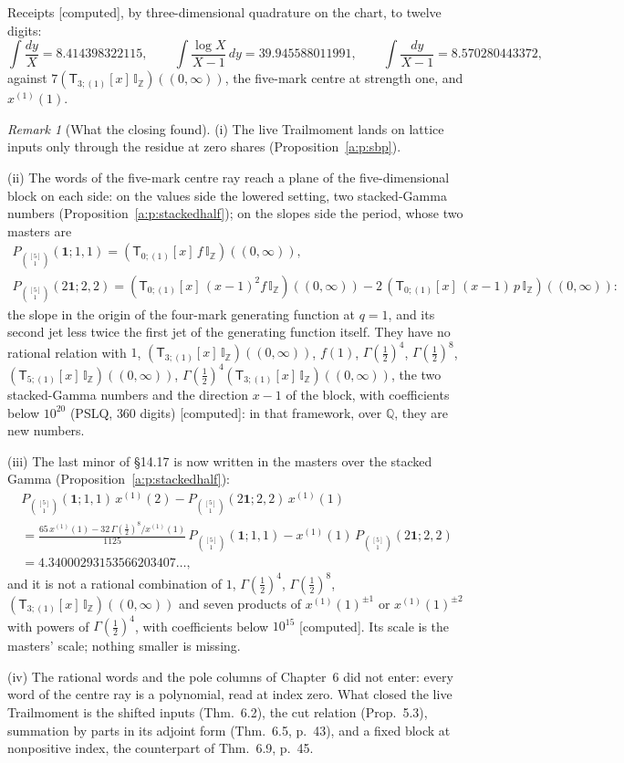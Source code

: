 \documentclass[11pt]{article}
\newcommand{\one}{\mathbf 1}
\newcommand{\sT}{\mathsf T}
\newcommand{\IZ}{\mathbb I_{\mathbb Z}}
\newcommand{\Tx}[3]{(\sT_{#1;(1)}[x]\,#2)((#3,\infty))}
\theoremstyle{plain}
\theoremstyle{definition}
\theoremstyle{remark}
\newtheorem{remark}[proposition]{Remark}
\newcommand{\computed}{\textup{[computed]}}
\begin{document}
\noindent Receipts \computed, by three-dimensional quadrature on the chart, to twelve digits:
\[
\int\frac{dy}X=8.414398322115,\qquad\int\frac{\log X}{X-1}\,dy=39.945588011991,\qquad\int\frac{dy}{X-1}=8.570280443372,
\]
against $7\Tx{3}{\IZ}{0}$, the five-mark centre at strength one, and $x^{(1)}(1)$.

\begin{remark}[What the closing found]\label{a:r:found}
(i) The live Trailmoment lands on lattice inputs only through the residue at zero shares (Proposition~\ref{a:p:sbp}).

(ii) The words of the five-mark centre ray reach a plane of the five-dimensional block on each side: on the values side the lowered setting, two stacked-Gamma numbers (Proposition~\ref{a:p:stackedhalf}); on the slopes side the period, whose two masters are
\begin{gather*}
P_{\binom{[5]}1}(\one;1,1)=\Tx{0}{f\,\IZ}{0},\\
P_{\binom{[5]}1}(2\one;2,2)=\Tx{0}{(x-1)^2f\,\IZ}{0}-2\,\Tx{0}{(x-1)\,p\,\IZ}{0}:
\end{gather*}
the slope in the origin of the four-mark generating function at $q=1$, and its second jet less twice the first jet of the generating function itself. They have no rational relation with $1$, $\Tx{3}{\IZ}{0}$, $f(1)$, $\Gamma(\frac12)^4$, $\Gamma(\frac12)^8$, $\Tx{5}{\IZ}{0}$, $\Gamma(\frac12)^4\Tx{3}{\IZ}{0}$, the two stacked-Gamma numbers and the direction $x-1$ of the block, with coefficients below $10^{20}$ (PSLQ, $360$ digits) \computed: in that framework, over $\mathbb Q$, they are new numbers.

(iii) The last minor of \S14.17 is now written in the masters over the stacked Gamma (Proposition~\ref{a:p:stackedhalf}):
\begin{multline*}
P_{\binom{[5]}1}(\one;1,1)\,x^{(1)}(2)-P_{\binom{[5]}1}(2\one;2,2)\,x^{(1)}(1)\\
=\frac{65\,x^{(1)}(1)-32\,\Gamma(\frac12)^8/x^{(1)}(1)}{1125}\,P_{\binom{[5]}1}(\one;1,1)-x^{(1)}(1)\,P_{\binom{[5]}1}(2\one;2,2)\\
=4.34000293153566203407\ldots,
\end{multline*}
and it is not a rational combination of $1$, $\Gamma(\frac12)^4$, $\Gamma(\frac12)^8$, $\Tx{3}{\IZ}{0}$ and seven products of $x^{(1)}(1)^{\pm1}$ or $x^{(1)}(1)^{\pm2}$ with powers of $\Gamma(\frac12)^4$, with coefficients below $10^{15}$ \computed. Its scale is the masters' scale; nothing smaller is missing.

(iv) The rational words and the pole columns of Chapter~6 did not enter: every word of the centre ray is a polynomial, read at index zero. What closed the live Trailmoment is the shifted inputs (Thm.~6.2), the cut relation (Prop.~5.3), summation by parts in its adjoint form (Thm.~6.5, p.~43), and a fixed block at nonpositive index, the counterpart of Thm.~6.9, p.~45.
\end{remark}
\end{document}
